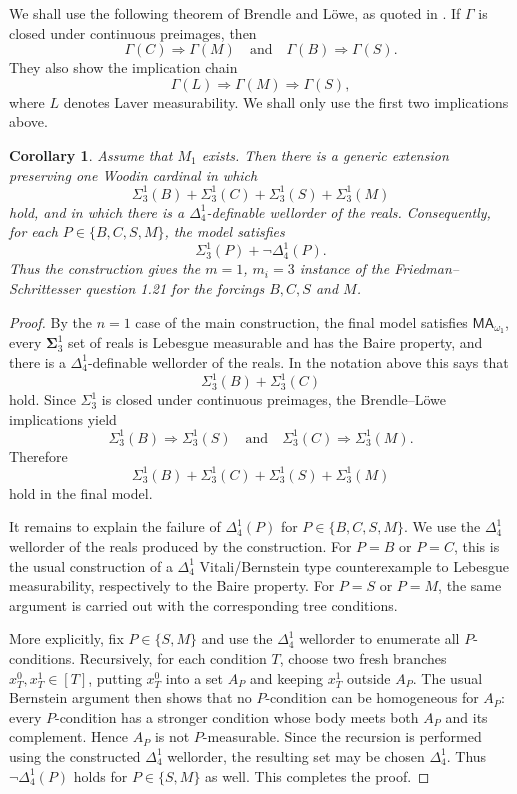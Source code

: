 \documentclass[a4paper,11pt]{article}
\newtheorem{corollary}[theorem]{Corollary}
\newcommand{\MA}{\mathsf{MA_{\omega_1}}}
\begin{document}
We shall use the following theorem of Brendle and L\"owe, as quoted in
\cite{FischerFriedmanKhomskii}. If $\Gamma$ is closed under continuous
preimages, then
\[
\Gamma(C)\Rightarrow \Gamma(M)
\quad\text{and}\quad
\Gamma(B)\Rightarrow \Gamma(S).
\]
They also show the implication chain
\[
\Gamma(L)\Rightarrow \Gamma(M)\Rightarrow \Gamma(S),
\]
where $L$ denotes Laver measurability. We shall only use the first two
implications above.

\begin{corollary}\label{corollary-generalized-measurability}
Assume that $M_1$ exists. Then there is a generic extension preserving one
Woodin cardinal in which
\[
\Sigma^1_3(B)+\Sigma^1_3(C)+\Sigma^1_3(S)+\Sigma^1_3(M)
\]
hold, and in which there is a $\Delta^1_4$-definable wellorder of the reals.
Consequently, for each $P\in\{B,C,S,M\}$, the model satisfies
\[
\Sigma^1_3(P)+\neg\Delta^1_4(P).
\]
Thus the construction gives the $m=1$, $m_i=3$ instance of the
Friedman--Schrittesser question 1.21 for the forcings $B,C,S$ and $M$.
\end{corollary}

\begin{proof}
By the $n=1$ case of the main construction, the final model satisfies $\MA$,
every $\boldsymbol{\Sigma}^1_3$ set of reals is Lebesgue measurable and has
the Baire property, and there is a $\Delta^1_4$-definable wellorder of the
reals. In the notation above this says that
\[
\Sigma^1_3(B)+\Sigma^1_3(C)
\]
hold. Since $\Sigma^1_3$ is closed under continuous preimages, the
Brendle--L\"owe implications yield
\[
\Sigma^1_3(B)\Rightarrow\Sigma^1_3(S)
\quad\text{and}\quad
\Sigma^1_3(C)\Rightarrow\Sigma^1_3(M).
\]
Therefore
\[
\Sigma^1_3(B)+\Sigma^1_3(C)+\Sigma^1_3(S)+\Sigma^1_3(M)
\]
hold in the final model.

It remains to explain the failure of $\Delta^1_4(P)$ for
$P\in\{B,C,S,M\}$. We use the $\Delta^1_4$ wellorder of the reals produced by
the construction. For $P=B$ or $P=C$, this is the usual construction of a
$\Delta^1_4$ Vitali/Bernstein type counterexample to Lebesgue measurability,
respectively to the Baire property. For $P=S$ or $P=M$, the same argument is
carried out with the corresponding tree conditions.

More explicitly, fix $P\in\{S,M\}$ and use the $\Delta^1_4$ wellorder to
enumerate all $P$-conditions. Recursively, for each condition $T$, choose two
fresh branches $x_T^0,x_T^1\in [T]$, putting $x_T^0$ into a set $A_P$ and
keeping $x_T^1$ outside $A_P$. The usual Bernstein argument then shows that no
$P$-condition can be homogeneous for $A_P$: every $P$-condition has a stronger
condition whose body meets both $A_P$ and its complement. Hence $A_P$ is not
$P$-measurable. Since the recursion is performed using the constructed 
$\Delta^1_4$ wellorder, the resulting set may be chosen $\Delta^1_4$. Thus
$\neg\Delta^1_4(P)$ holds for $P\in\{S,M\}$ as well. This completes the proof.
\end{proof}
\end{document}
